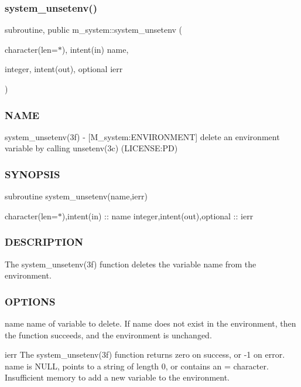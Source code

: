 \subsubsection{\texorpdfstring{system\+\_\+unsetenv()}{system\_unsetenv()}}
{\footnotesize\ttfamily subroutine, public m\+\_\+system\+::system\+\_\+unsetenv (\begin{DoxyParamCaption}\item[{character(len=$\ast$), intent(in)}]{name,  }\item[{integer, intent(out), optional}]{ierr }\end{DoxyParamCaption})}



\subsubsection*{N\+A\+ME}

system\+\_\+unsetenv(3f) -\/ \mbox{[}M\+\_\+system\+:E\+N\+V\+I\+R\+O\+N\+M\+E\+NT\mbox{]} delete an environment variable by calling unsetenv(3c) (L\+I\+C\+E\+N\+SE\+:PD) \subsubsection*{S\+Y\+N\+O\+P\+S\+IS}

subroutine system\+\_\+unsetenv(name,ierr)

character(len=$\ast$),intent(in) \+:\+: name integer,intent(out),optional \+:\+: ierr

\subsubsection*{D\+E\+S\+C\+R\+I\+P\+T\+I\+ON}

\begin{DoxyVerb}The system_unsetenv(3f) function deletes the variable name from the
environment.
\end{DoxyVerb}


\subsubsection*{O\+P\+T\+I\+O\+NS}

name name of variable to delete. If name does not exist in the environment, then the function succeeds, and the environment is unchanged.

ierr The system\+\_\+unsetenv(3f) function returns zero on success, or -\/1 on error. name is N\+U\+LL, points to a string of length 0, or contains an \textquotesingle{}=\textquotesingle{} character. Insufficient memory to add a new variable to the environment.

